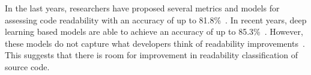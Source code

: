 \documentclass[%
class=scrreprt,
chapterprefix=false,%
open=right,%
twoside=false,%
paper=a4,%
logofile={Logo\_zentral\_farbig\_EN.png},%
thesistype=master,%
UKenglish,%
]{se2thesis}
\begin{document}
	In the last years, researchers have proposed several metrics and models for assessing code readability with an accuracy of up to 81.8\%~\cite{buse2009learning, posnett2011simpler, dorn2012general, daka2015modeling}. In recent years, deep learning based models are able to achieve an accuracy of up to 85.3\%~\cite{mi2018improving, mi2022towards}.
	However, these models do not capture what developers think of readability improvements~\cite{fakhoury2019improving}. This suggests that there is room for improvement in readability classification of source code.
	
%	
\end{document}
